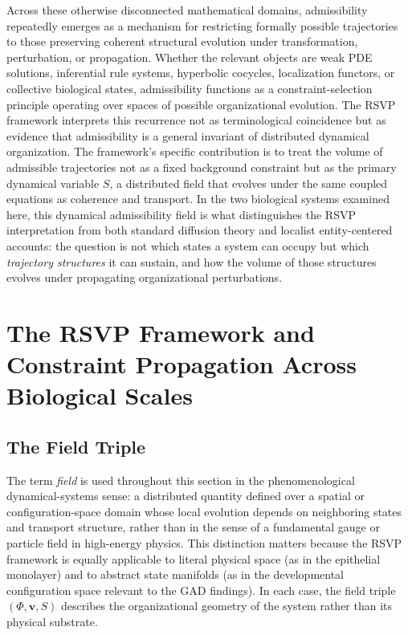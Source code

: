 \documentclass[11pt,a4paper]{article}
\theoremstyle{plain}
\theoremstyle{definition}
\begin{document}
Across these otherwise disconnected mathematical domains, admissibility repeatedly
emerges as a mechanism for restricting formally possible trajectories to those
preserving coherent structural evolution under transformation, perturbation, or
propagation. Whether the relevant objects are weak PDE solutions, inferential rule
systems, hyperbolic cocycles, localization functors, or collective biological states,
admissibility functions as a constraint-selection principle operating over spaces of
possible organizational evolution. The RSVP framework interprets this recurrence not
as terminological coincidence but as evidence that admissibility is a general invariant
of distributed dynamical organization. The framework's specific contribution is to
treat the volume of admissible trajectories not as a fixed background constraint but
as the primary dynamical variable $S$, a distributed field that evolves under the same
coupled equations as coherence and transport. In the two biological systems examined
here, this dynamical admissibility field is what distinguishes the RSVP interpretation
from both standard diffusion theory and localist entity-centered accounts: the question
is not which states a system can occupy but which \emph{trajectory structures} it can
sustain, and how the volume of those structures evolves under propagating organizational
perturbations.

\section{The RSVP Framework and Constraint Propagation Across Biological Scales}
\label{sec:rsvp}

\subsection{The Field Triple}

The term \emph{field} is used throughout this section in the phenomenological
dynamical-systems sense: a distributed quantity defined over a spatial or
configuration-space domain whose local evolution depends on neighboring states and
transport structure, rather than in the sense of a fundamental gauge or particle field
in high-energy physics. This distinction matters because the RSVP framework is equally
applicable to literal physical space (as in the epithelial monolayer) and to abstract
state manifolds (as in the developmental configuration space relevant to the GAD
findings). In each case, the field triple $(\Phi, \mathbf{v}, S)$ describes the
organizational geometry of the system rather than its physical substrate.
\end{document}
